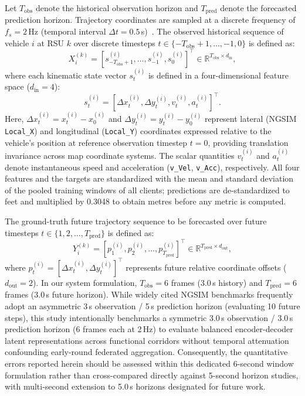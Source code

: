 \documentclass[journal]{IEEEtran}
\begin{document}
Let $T_{\mathrm{obs}}$ denote the historical observation horizon and $T_{\mathrm{pred}}$ denote the forecasted prediction horizon. Trajectory coordinates are sampled at a discrete frequency of $f_s = 2$\,Hz (temporal interval $\Delta t = 0.5$\,s)~\cite{fhwa2006ngsim}. The observed historical sequence of vehicle $i$ at RSU $k$ over discrete timesteps $t \in \{-T_{\mathrm{obs}}+1, \dots, -1, 0\}$ is defined as:
\begin{equation}
X_i^{(k)} = [s_{-T_{\mathrm{obs}}+1}^{(i)}, \dots, s_{-1}^{(i)}, s_0^{(i)}]^\top \in \mathbb{R}^{T_{\mathrm{obs}} \times d_{\mathrm{in}}},
\label{eq:input_sequence}
\end{equation}
where each kinematic state vector $s_t^{(i)}$ is defined in a four-dimensional feature space ($d_{\mathrm{in}} = 4$):
\begin{equation}
s_t^{(i)} = [\Delta x_t^{(i)}, \Delta y_t^{(i)}, v_t^{(i)}, a_t^{(i)}]^\top.
\label{eq:state_vector}
\end{equation}
Here, $\Delta x_t^{(i)} = x_t^{(i)} - x_0^{(i)}$ and $\Delta y_t^{(i)} = y_t^{(i)} - y_0^{(i)}$ represent lateral (NGSIM \texttt{Local\_X}) and longitudinal (\texttt{Local\_Y}) coordinates expressed relative to the vehicle's position at reference observation timestep $t=0$, providing translation invariance across map coordinate systems. The scalar quantities $v_t^{(i)}$ and $a_t^{(i)}$ denote instantaneous speed and acceleration (\texttt{v\_Vel}, \texttt{v\_Acc}), respectively. All four features and the targets are standardized with the mean and standard deviation of the pooled training windows of all clients; predictions are de-standardized to feet and multiplied by 0.3048 to obtain metres before any metric is computed.

The ground-truth future trajectory sequence to be forecasted over future timesteps $t \in \{1, 2, \dots, T_{\mathrm{pred}}\}$ is defined as:
\begin{equation}
Y_i^{(k)} = [p_1^{(i)}, p_2^{(i)}, \dots, p_{T_{\mathrm{pred}}}^{(i)}]^\top \in \mathbb{R}^{T_{\mathrm{pred}} \times d_{\mathrm{out}}},
\label{eq:target_sequence}
\end{equation}
where $p_t^{(i)} = [\Delta x_t^{(i)}, \Delta y_t^{(i)}]^\top$ represents future relative coordinate offsets ($d_{\mathrm{out}} = 2$). In our system formulation, $T_{\mathrm{obs}} = 6$ frames ($3.0$\,s history) and $T_{\mathrm{pred}} = 6$ frames ($3.0$\,s future horizon). While widely cited NGSIM benchmarks frequently adopt an asymmetric 3\,s observation / 5\,s prediction horizon (evaluating 10 future steps), this study intentionally benchmarks a symmetric 3.0\,s observation / 3.0\,s prediction horizon (6 frames each at 2\,Hz) to evaluate balanced encoder-decoder latent representations across functional corridors without temporal attenuation confounding early-round federated aggregation. Consequently, the quantitative errors reported herein should be assessed within this dedicated 6-second window formulation rather than cross-compared directly against 5-second horizon studies, with multi-second extension to 5.0\,s horizons designated for future work.
\end{document}
